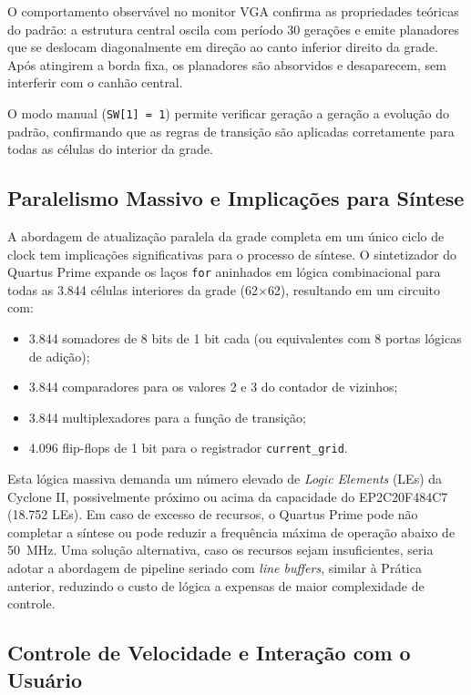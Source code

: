 \documentclass[12pt, a4paper]{article}
\begin{document}
	O comportamento observável no monitor VGA confirma as propriedades teóricas do
	padrão: a estrutura central oscila com período 30 gerações e emite planadores
	que se deslocam diagonalmente em direção ao canto inferior direito da grade.
	Após atingirem a borda fixa, os planadores são absorvidos e desaparecem, sem
	interferir com o canhão central.
	
	O modo manual (\texttt{SW[1] = 1}) permite verificar geração a geração a
	evolução do padrão, confirmando que as regras de transição são aplicadas
	corretamente para todas as células do interior da grade.
	
	\subsection{Paralelismo Massivo e Implicações para Síntese}
	
	A abordagem de atualização paralela da grade completa em um único ciclo de clock
	tem implicações significativas para o processo de síntese. O sintetizador do
	Quartus Prime expande os laços \texttt{for} aninhados em lógica combinacional
	para todas as 3.844 células interiores da grade (62$\times$62), resultando em
	um circuito com:
	
	\begin{itemize}
		\item 3.844 somadores de 8 bits de 1 bit cada (ou equivalentes com 8 portas
		lógicas de adição);
		\item 3.844 comparadores para os valores 2 e 3 do contador de vizinhos;
		\item 3.844 multiplexadores para a função de transição;
		\item 4.096 flip-flops de 1 bit para o registrador \texttt{current\_grid}.
	\end{itemize}
	
	Esta lógica massiva demanda um número elevado de \textit{Logic Elements} (LEs)
	da Cyclone II, possivelmente próximo ou acima da capacidade do EP2C20F484C7
	(18.752 LEs). Em caso de excesso de recursos, o Quartus Prime pode não completar
	a síntese ou pode reduzir a frequência máxima de operação abaixo de 50~MHz.
	Uma solução alternativa, caso os recursos sejam insuficientes, seria adotar
	a abordagem de pipeline seriado com \textit{line buffers}, similar à Prática
	anterior, reduzindo o custo de lógica a expensas de maior complexidade de
	controle.
	
	\subsection{Controle de Velocidade e Interação com o Usuário}
	
\end{document}
